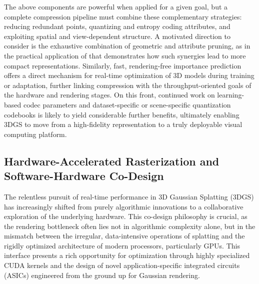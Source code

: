 \documentclass[11pt,a4paper]{article}
\begin{document}
The above components are powerful when applied for a given goal, but a complete compression pipeline must combine these complementary strategies: reducing redundant points, quantizing and entropy coding attributes, and exploiting spatial and view-dependent structure. A motivated direction to consider is the exhaustive combination of geometric and attribute pruning, as in the practical application of \cite{arxiv:2606.21244v1} that demonstrates how such synergies lead to more compact representations. Similarly, fast, rendering-free importance prediction \cite{arxiv:2602.19753v1} offers a direct mechanism for real-time optimization of 3D models during training or adaptation, further linking compression with the throughput-oriented goals of the hardware and rendering stages. On this front, continued work on learning-based codec parameters and dataset-specific or scene-specific quantization codebooks is likely to yield considerable further benefits, ultimately enabling 3DGS to move from a high-fidelity representation to a truly deployable visual computing platform.


\subsection{Hardware-Accelerated Rasterization and Software-Hardware Co-Design}


The relentless pursuit of real-time performance in 3D Gaussian Splatting (3DGS) has increasingly shifted from purely algorithmic innovations to a collaborative exploration of the underlying hardware. This co-design philosophy is crucial, as the rendering bottleneck often lies not in algorithmic complexity alone, but in the mismatch between the irregular, data-intensive operations of splatting and the rigidly optimized architecture of modern processors, particularly GPUs. This interface presents a rich opportunity for optimization through highly specialized CUDA kernels and the design of novel application-specific integrated circuits (ASICs) engineered from the ground up for Gaussian rendering.
\end{document}
